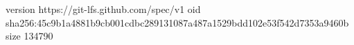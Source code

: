 version https://git-lfs.github.com/spec/v1
oid sha256:45c9b1a4881b9cb001cdbc289131087a487a1529bdd102e53f542d7353a9460b
size 134790
